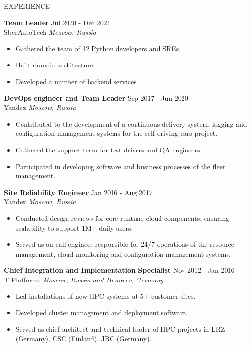 \documentclass{resume} %
\begin{document}
\begin{rSection}{EXPERIENCE}
\begin{itemize}
\end{itemize}

\textbf{Team Leader} \hfill Jul 2020 - Dec 2021\\
SberAutoTech \hfill \textit{Moscow, Russia}
\begin{itemize}
   \itemsep -3pt {}
   \item Gathered the team of 12 Python developers and SREs.
   \item Built domain architecture.
   \item Developed a number of backend services.
\end{itemize}

\textbf{DevOps engineer and Team Leader} \hfill Sep 2017 - Jun 2020\\
Yandex \hfill \textit{Moscow, Russia}
\begin{itemize}
   \itemsep -3pt {}
   \item Contributed to the development of a continuous delivery system, logging and configuration management systems for the self-driving cars project.
   \item Gathered the support team for test drivers and QA engineers.
   \item Participated in developing software and business processes of the fleet management.
\end{itemize}

\pagebreak

\textbf{Site Reliability Engineer} \hfill Jan 2016 - Aug 2017\\
Yandex \hfill \textit{Moscow, Russia}
\begin{itemize}
   \itemsep -3pt {}
   \item Conducted design reviews for core runtime cloud components, ensuring scalability to support 1M+ daily users.
   \item Served as on-call engineer responsible for 24/7 operations of the resource management, cloud monitoring and configuration management systems.
\end{itemize}

\textbf{Chief Integration and Implementation Specialist} \hfill Nov 2012 - Jan 2016\\
T-Platforms \hfill \textit{Moscow, Russia and Hanover, Germany}
\begin{itemize}
   \itemsep -3pt {}
   \item Led installations of new HPC systems at 5+ customer sites.
   \item Developed cluster management and deployment software.
   \item Served as chief architect and technical leader of HPC projects in LRZ (Germany), CSC (Finland), JRC (Germany).
\end{itemize}


\end{rSection}
\end{document}
